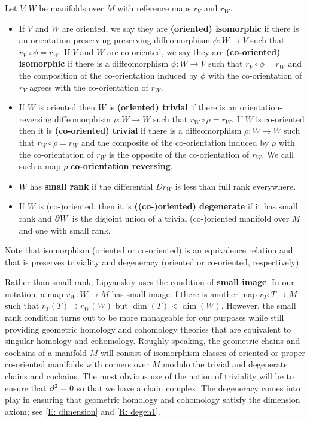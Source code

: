 \begin{definition}\label{D: equiv, triv, and small}
 Let $V, W$ be manifolds over $M$ with reference maps $r_V$ and $r_W$.
	\begin{itemize}
		\item If $V$ and $W$ are oriented, we say they are \textbf{(oriented) isomorphic} if there is an orientation-preserving preserving diffeomorphism $\phi \colon W \to V$ such that $r_V \circ \phi = r_W$. If $V$ and $W$ are co-oriented, we say they are \textbf{(co-oriented) isomorphic} if there is a diffeomorphism $\phi \colon W \to V$ such that $r_V \circ \phi = r_W$ and the composition of the
co-orientation induced by $\phi$
with the co-orientation of $r_V$ agrees with the co-orientation of $r_W$.


		\item If $W$ is oriented then $W$ is \textbf{(oriented) trivial} if there is an orientation-reversing
 diffeomorphism $\rho \colon W \to W$ such that $r_W \circ \rho = r_W$. If $W$ is co-oriented then it is \textbf{(co-oriented) trivial} if there is a diffeomorphism $\rho \colon W \to W$ such that $r_W \circ \rho = r_W$ and
		the composite of the co-orientation induced by $\rho$ with the co-orientation of $r_W$ is the opposite of the co-orientation of $r_W$. We call such a map $\rho$ \textbf{co-orientation reversing}.

\item $W$ has \textbf{small rank} if the differential $D r_W$ is less than full rank everywhere.
		\item If $W$ is (co-)oriented, then it is \textbf{((co-)oriented) degenerate} if it has small rank and ${\partial W}$ is the disjoint union of a trivial (co-)oriented
		manifold over $M$ and one with small rank.
	\end{itemize}
\end{definition}

Note that isomorphism (oriented or co-oriented) is an equivalence relation and that is preserves triviality and degeneracy (oriented or co-oriented, respectively).




Rather than small rank, Lipyanskiy uses the condition of \textbf{small image}. In our notation, a map $r_W \colon W \to M$ has small image if there is another map $r_T:T \to M$ such that $r_T(T)\supset r_W(W)$ but $\dim(T)<\dim(W)$. However, the small rank condition turns out to be more manageable for our purposes while still providing geometric homology and cohomology theories that are equivalent to singular homology and cohomology. Roughly speaking, the geometric chains and cochains of a manifold $M$ will consist of isomorphism classes of oriented or proper co-oriented manifolds with corners over $M$ modulo the trivial and degenerate chains and cochains. The most obvious use of the notion of triviality will be to ensure that $\partial^2 = 0$ so that we have a chain complex. The degeneracy comes into play in ensuring that geometric homology and cohomology satisfy the dimension axiom; see \cref{E: dimension} and \cref{R: degen1}.








